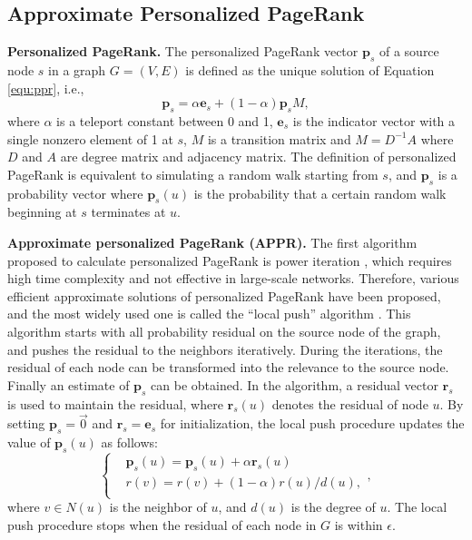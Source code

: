 \subsection{Approximate Personalized PageRank}
\textbf{Personalized PageRank.} The personalized PageRank vector $\bm{p}_s$ of a source node $s$ in a graph $G=(V,E)$ is defined as the unique solution of Equation \ref{equ:ppr}, i.e.,
\begin{equation}
    \bm{p}_s = \alpha \bm{e}_s + (1-\alpha) \bm{p}_s M,
    \label{equ:ppr}
\end{equation}
where $\alpha$ is a teleport constant between 0 and 1, $\bm{e}_s$ is the indicator vector with a single nonzero element of 1 at $s$, $M$ is a transition matrix and $M=D^{-1}A$ where $D$ and $A$ are degree matrix and adjacency matrix. The definition of personalized PageRank is equivalent to simulating a random walk starting from $s$, and $\bm{p}_s$ is a probability vector where $\bm{p}_s(u)$ is the probability that a certain random walk beginning at $s$ terminates at $u$. 

\textbf{Approximate personalized PageRank (APPR).} The first algorithm proposed to calculate personalized PageRank is power iteration \cite{page1999pagerank}, which requires high time complexity and not effective in large-scale networks.
Therefore, various efficient approximate solutions of personalized PageRank have been proposed, and the most widely used one is called the ``local push'' algorithm \cite{andersen2006local}. This algorithm starts with all probability residual on the source node of the graph, and pushes the residual to the neighbors iteratively. During the iterations, the residual of each node can be transformed into the relevance to the source node. Finally an estimate of $\bm{p}_s$ can be obtained. In the algorithm, a residual vector $\bm{r}_s$ is used to maintain the residual, where $\bm{r}_s(u)$ denotes the residual of node $u$. By setting $\bm{p}_s=\vec{0}$ and $\bm{r}_s=\bm{e}_s$ for initialization, the local push procedure updates the value of $\bm{p}_s(u)$ as follows:
\begin{equation}
    \begin{cases}
    & \bm{p}_s(u)=\bm{p}_s(u)+\alpha \bm{r}_s(u) \\
    & r(v)=r(v)+(1-\alpha)r(u) / d(u), \\
    \end{cases},
    \label{equ:local_push_appr}
\end{equation}
where $v \in N(u)$ is the neighbor of $u$, and 
$d(u)$ is the degree of $u$.
The local push procedure stops when the residual of each node in $G$ is within $\epsilon$.
